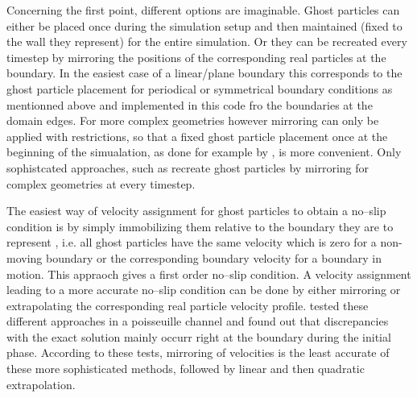 \documentclass{report}
\begin{document}
Concerning the first point, different options are imaginable. Ghost particles can either be placed once during the simulation setup and then maintained (fixed to the wall they represent) for the entire simulation. Or they can be recreated every timestep by mirroring the positions of the corresponding real particles at the boundary. In the easiest case of a linear/plane boundary this corresponds to the ghost particle placement for periodical or symmetrical boundary conditions as mentionned above and implemented in this code fro the boundaries at the domain edges.
For more complex geometries however mirroring can only be applied with restrictions, so that a fixed ghost particle placement once at the beginning of the simualation, as done for example by \cite{Morris1997, Morris1999}, is more convenient. Only sophistcated approaches, such as \cite{Yildit2009} recreate ghost particles by mirroring for complex geometries at every timestep.

The easiest way of velocity assignment for ghost particles to obtain a no--slip condition is by simply immobilizing them relative to the boundary they are to represent \cite{Morris1997}, i.e. all ghost particles have the same velocity which is zero for a non-moving boundary or the corresponding boundary velocity for a boundary in motion. This appraoch gives a first order no--slip condition. A velocity assignment leading to a more accurate no--slip condition can be done by either mirroring or extrapolating the corresponding real particle velocity profile. \cite{Basa2009} tested these different approaches in a poisseuille channel and found out that discrepancies with the exact solution mainly occurr right at the boundary during the initial phase.  According to these tests, mirroring of velocities is the least accurate of these more sophisticated methods, followed by linear and then quadratic extrapolation. 
\end{document}

